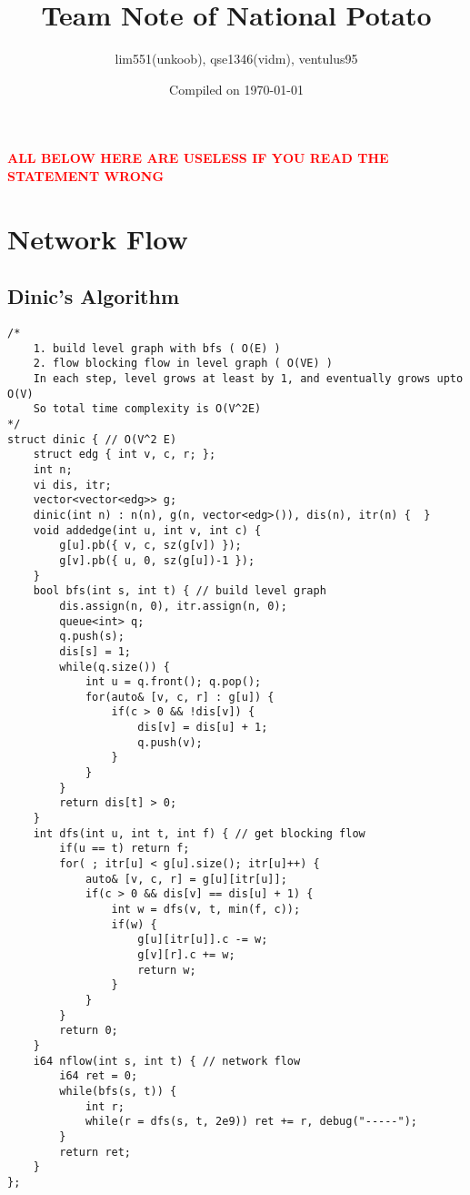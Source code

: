 \documentclass[landscape, 8pt, a4paper, oneside, twocolumn]{extarticle}
\title{Team Note of National Potato}
\author{lim551(unkoob), qse1346(vidm), ventulus95}
\date{Compiled on \today}
\begin{document}
{
	\Large

	\maketitle

\tableofcontents
}
\thispagestyle{fancy}
\pagebreak

\textcolor{red}{\textbf{ALL BELOW HERE ARE USELESS IF YOU READ THE STATEMENT WRONG}}

\section{Network Flow}
\subsection {Dinic's Algorithm}
\begin{verbatim}
/*
	1. build level graph with bfs ( O(E) )
	2. flow blocking flow in level graph ( O(VE) )
	In each step, level grows at least by 1, and eventually grows upto O(V)
	So total time complexity is O(V^2E)
*/
struct dinic { // O(V^2 E)
	struct edg { int v, c, r; };
	int n;
	vi dis, itr;
	vector<vector<edg>> g;
	dinic(int n) : n(n), g(n, vector<edg>()), dis(n), itr(n) {  }
	void addedge(int u, int v, int c) {
		g[u].pb({ v, c, sz(g[v]) });
		g[v].pb({ u, 0, sz(g[u])-1 });
	}
	bool bfs(int s, int t) { // build level graph
		dis.assign(n, 0), itr.assign(n, 0);
		queue<int> q;
		q.push(s);
		dis[s] = 1;
		while(q.size()) {
			int u = q.front(); q.pop();
			for(auto& [v, c, r] : g[u]) {
				if(c > 0 && !dis[v]) {
					dis[v] = dis[u] + 1;
					q.push(v);
				}
			}
		}
		return dis[t] > 0;
	}
	int dfs(int u, int t, int f) { // get blocking flow
		if(u == t) return f;
		for( ; itr[u] < g[u].size(); itr[u]++) {
			auto& [v, c, r] = g[u][itr[u]];
			if(c > 0 && dis[v] == dis[u] + 1) {
				int w = dfs(v, t, min(f, c));
				if(w) {
					g[u][itr[u]].c -= w;
					g[v][r].c += w;
					return w;
				}
			}
		}
		return 0;
	}
	i64 nflow(int s, int t) { // network flow
		i64 ret = 0;
		while(bfs(s, t)) {
			int r;
			while(r = dfs(s, t, 2e9)) ret += r, debug("-----");
		}
		return ret;
	}
};
\end{verbatim}
\end{document}
